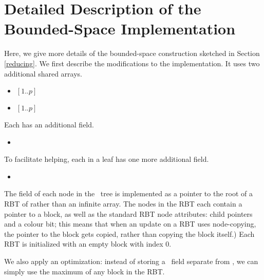 
\section{Detailed Description of the Bounded-Space Implementation}
\label{reducing-details}


\renewcommand{\algorithmiccomment}[1]{\hfill\eqparbox{COMMENTSINGLEAPP}{\com\ #1}}

Here, we give more details of the bounded-space construction sketched in Section \ref{reducing}.
We first describe the modifications to the implementation.
It uses two additional shared arrays.
\begin{itemize}
\item {} $[1..p]$ 
\item {} $[1..p]$ 
\end{itemize}
Each  has an additional field.
\begin{itemize}
\item {}  
\end{itemize}
To facilitate helping, each  in a leaf has one more additional field.
\begin{itemize}
\item {}  
\end{itemize}
The  field of each node in the \ordering\ tree is implemented as a pointer to the root of a RBT of  rather than an infinite array.  
The nodes in the RBT each contain a pointer to a block, as well as the standard RBT node attributes: child pointers and a colour bit; this means that when an update on a RBT uses node-copying, the pointer to the block
gets copied, rather than copying the block itself.)
Each RBT is initialized with an empty block with index 0.


We also apply an optimization:  instead of storing a \head\ field separate from ,
we can simply use the maximum  of any block in the  RBT.



